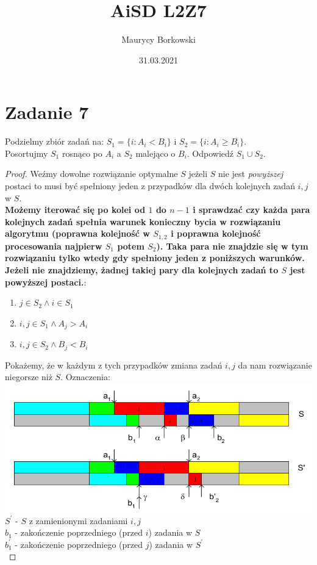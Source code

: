\documentclass{article}
\title{AiSD L2Z7}
\date{31.03.2021}
\author{Maurycy Borkowski}
\begin{document}
\maketitle

\section{Zadanie 7}
Podzielmy zbiór zadań na: $S_1 = \{i: A_i < B_i\}$ i $S_2 = \{i: A_i \geq B_i\}$.\\ Posortujmy $S_1$ rosnąco po $A_i$ a $S_2$ malejąco o $B_i$. Odpowiedź $S_1 \cup S_2$.
\begin{proof}
Weźmy dowolne rozwiązanie optymalne $S$ jeżeli $S$ nie jest \textit{powyższej} postaci to musi być spełniony jeden z przypadków dla dwóch kolejnych zadań $i,j$ w $S$.\\\textbf{Możemy iterować się po kolei od $1$ do $n-1$ i sprawdzać czy każda para kolejnych zadań spełnia warunek konieczny bycia w rozwiązaniu algorytmu (poprawna kolejność w $S_{1,2}$ i poprawna kolejność procesowania najpierw $S_1$ potem $S_2$). Taka para nie znajdzie się w tym rozwiązaniu tylko wtedy gdy spełniony jeden z poniższych warunków. Jeżeli nie znajdziemy, żadnej takiej pary dla kolejnych zadań to $S$ jest powyższej postaci.}:
\begin{enumerate}
    \item $j \in S_2 \land i \in S_1$
    \item $i,j \in S_1 \land A_j > A_i$
    \item $i,j \in S_2 \land B_j < B_i$
\end{enumerate}
Pokażemy, że w każdym z tych przypadków zmiana zadań $i,j$ da nam rozwiązanie niegorsze niż $S$. Oznaczenia:\\
\includegraphics[scale=0.5]{zad7}
$S^\prime$ - $S$ z zamienionymi zadaniami $i,j$\\
$b_{1}$ - zakończenie poprzedniego (przed $i$) zadania w $S$\\
$b_{1}^\prime$ - zakończenie poprzedniego (przed $j$) zadania w $S^\prime$\\

\end{proof}
\end{document}
